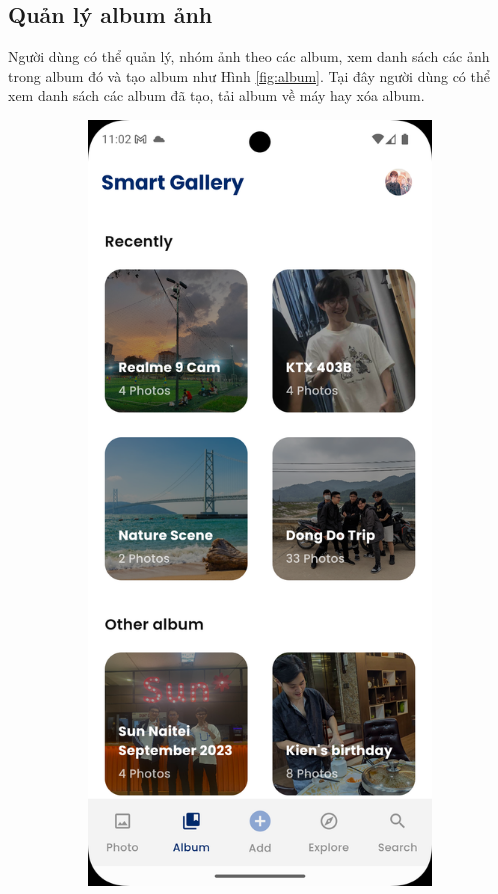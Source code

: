 \subsection{Quản lý album ảnh}

Người dùng có thể quản lý, nhóm ảnh theo các album, xem danh sách các ảnh trong album đó và tạo album như Hình \ref{fig:album}. Tại đây người dùng có thể xem danh sách các album đã tạo, tải album về máy hay xóa album.

\begin{figure}[H]
    \centering
    \begin{subfigure}{0.32\textwidth}
        \includegraphics[width=1\linewidth]{figures/c4/4-2/album_1.png} 

\end{subfigure}
\end{figure}
